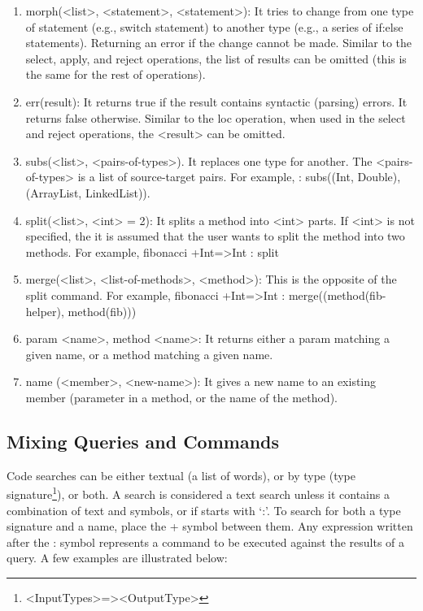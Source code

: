 \begin{enumerate}
	\item morph(<list>, <statement>, <statement>): It tries to change from one type of statement 
	(e.g., switch statement) to another type (e.g., a series of if:else statements). Returning an 
	error if the change cannot be made. Similar to the select, apply, and reject operations, the 
	list of results can be omitted (this is the same for the rest of operations).   
	
	\item err(result): It returns true if the result contains syntactic (parsing) errors. 
	It returns false otherwise. Similar to the loc operation, when used in the select and reject 
	operations, the <result> can be omitted.
	
	\item subs(<list>, <pairs-of-types>). It replaces one type for another. The 
	<pairs-of-types> is a list of source-target pairs. For example, : subs((Int, Double),
	(ArrayList, LinkedList)).
	
	\item split(<list>, <int> = 2): It splits a method into <int> parts. If <int> is not 
	specified, the it is assumed that the user wants to split the method into two methods. For 
	example, fibonacci +Int=>Int : split

   \item merge(<list>, <list-of-methods>, <method>): This is the opposite of the split command. 
	For example, fibonacci +Int=>Int : merge((method(fib-helper), method(fib)))
	
	\item param <name>, method <name>: It returns either a param matching a given name, 
	or a method matching a given name.
	
	\item name (<member>, <new-name>): It gives a new name to an existing member (parameter in 
	a method, or the name of the method).
	
\end{enumerate}

\subsection{Mixing Queries and Commands}
\label{sec:queriescommands}

Code searches can be either textual (a list of words), or by type (type signature\footnote{<InputTypes>=><OutputType>}), or both. A search is considered a text search unless it contains a combination of text and symbols, or if starts with `:'. To search for both a type signature and a name, place the + symbol between them. Any expression written after the : symbol represents a command to be executed against the results of a query. A few examples are illustrated below:

